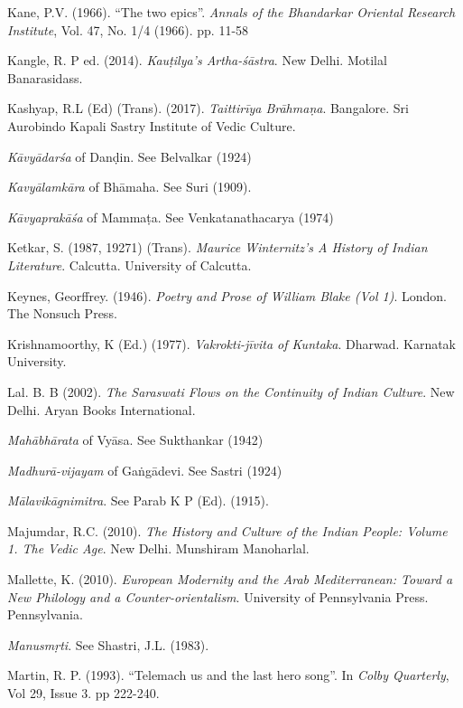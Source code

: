 \begin{thebibliography}{99}
Kane, P.V. (1966). “The two epics”. {\sl Annals of the Bhandarkar Oriental Research Institute}, Vol. 47, No. 1/4 (1966). pp. 11-58 

Kangle, R. P ed. (2014). {\sl Kauṭilya’s Artha-śāstra}. New Delhi. Motilal Banarasidass. 

Kashyap, R.L (Ed) (Trans). (2017). {\sl Taittirīya Brāhmaṇa}. Bangalore. Sri Aurobindo Kapali Sastry Institute of Vedic Culture. 

{\sl Kāvyādarśa} of Danḍin. See Belvalkar (1924)  

{\sl Kavyālamkāra} of Bhāmaha. See Suri (1909).

{\sl Kāvyaprakāśa} of Mammaṭa. See Venkatanathacarya (1974)

Ketkar, S. (1987, 19271) (Trans). {\sl Maurice Winternitz’s A History of Indian Literature}. Calcutta. University of Calcutta. 

Keynes, Georffrey. (1946). {\sl Poetry and Prose of William Blake (Vol 1)}. London. The Nonsuch Press. 

Krishnamoorthy, K (Ed.) (1977). {\sl Vakrokti-jīvita of Kuntaka}. Dharwad. Karnatak University. 

Lal. B. B (2002). {\sl The Saraswati Flows on the Continuity of Indian Culture}. New Delhi. Aryan Books  
International. 

{\sl Mahābhārata} of Vyāsa. See Sukthankar (1942)

{\sl Madhurā-vijayam} of Gaṅgādevi. See Sastri (1924)

{\sl Mālavikāgnimitra}. See Parab K P (Ed). (1915).

Majumdar, R.C. (2010). {\sl The History and Culture of the Indian People: Volume 1. The Vedic Age}. New Delhi. Munshiram Manoharlal. 

Mallette, K. (2010). {\sl European Modernity and the Arab Mediterranean: Toward a New Philology and a Counter-orientalism}. University of Pennsylvania Press. Pennsylvania.

{\sl Manusmṛti}. See Shastri, J.L. (1983).

Martin, R. P. (1993). “Telemach us and the last hero song”. In {\sl Colby Quarterly}, Vol 29, Issue 3. pp 222-240.


\end{thebibliography}
